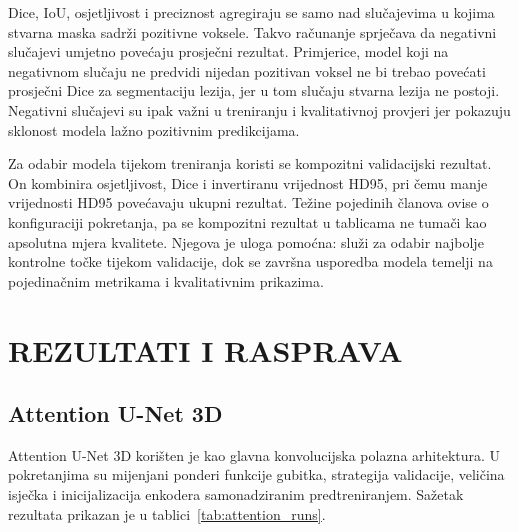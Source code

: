 \documentclass[a4paper,12pt,oneside]{article}
\let\sectionwithoutpagebreak\section
\renewcommand{\section}{\clearpage\sectionwithoutpagebreak}%
\begin{document}
Dice, IoU, osjetljivost i preciznost agregiraju se samo nad slučajevima u kojima stvarna maska sadrži pozitivne voksele. Takvo računanje sprječava da negativni slučajevi umjetno povećaju prosječni rezultat. Primjerice, model koji na negativnom slučaju ne predvidi nijedan pozitivan voksel ne bi trebao povećati prosječni Dice za segmentaciju lezija, jer u tom slučaju stvarna lezija ne postoji. Negativni slučajevi su ipak važni u treniranju i kvalitativnoj provjeri jer pokazuju sklonost modela lažno pozitivnim predikcijama.

Za odabir modela tijekom treniranja koristi se kompozitni validacijski rezultat. On kombinira osjetljivost, Dice i invertiranu vrijednost HD95, pri čemu manje vrijednosti HD95 povećavaju ukupni rezultat. Težine pojedinih članova ovise o konfiguraciji pokretanja, pa se kompozitni rezultat u tablicama ne tumači kao apsolutna mjera kvalitete. Njegova je uloga pomoćna: služi za odabir najbolje kontrolne točke tijekom validacije, dok se završna usporedba modela temelji na pojedinačnim metrikama i kvalitativnim prikazima.

\section{REZULTATI I RASPRAVA}

\subsection{Attention U-Net 3D}

Attention U-Net 3D korišten je kao glavna konvolucijska polazna arhitektura. U pokretanjima su mijenjani ponderi funkcije gubitka, strategija validacije, veličina isječka i inicijalizacija enkodera samonadziranim predtreniranjem. Sažetak rezultata prikazan je u tablici~\ref{tab:attention_runs}.
\end{document}
